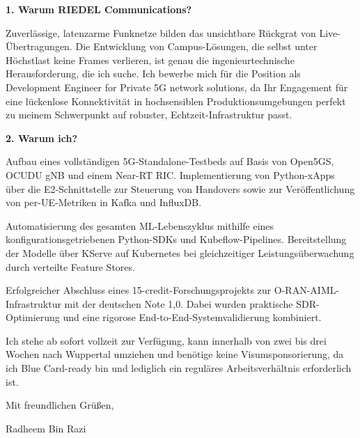 \documentclass[11pt,a4paper]{coverletter}
\begin{document}
\vspace{8pt}\noindent\textbf{1. Warum RIEDEL Communications?}\par\vspace{3pt}

Zuverlässige, latenzarme Funknetze bilden das unsichtbare Rückgrat von Live-Übertragungen. Die Entwicklung von Campus-Lösungen, die selbst unter Höchstlast keine Frames verlieren, ist genau die ingenieurtechnische Herausforderung, die ich suche. Ich bewerbe mich für die Position als Development Engineer for Private 5G network solutions, da Ihr Engagement für eine lückenlose Konnektivität in hochsensiblen Produktionsumgebungen perfekt zu meinem Schwerpunkt auf robuster, Echtzeit-Infrastruktur passt.

\vspace{8pt}\noindent\textbf{2. Warum ich?}\par\vspace{3pt}

\bullets

  \item Aufbau eines vollständigen 5G-Standalone-Testbeds auf Basis von Open5GS, OCUDU gNB und einem Near-RT RIC. Implementierung von Python-xApps über die E2-Schnittstelle zur Steuerung von Handovers sowie zur Veröffentlichung von per-UE-Metriken in Kafka und InfluxDB.

  \item Automatisierung des gesamten ML-Lebenszyklus mithilfe eines konfigurationsgetriebenen Python-SDKs und Kubeflow-Pipelines. Bereitstellung der Modelle über KServe auf Kubernetes bei gleichzeitiger Leistungsüberwachung durch verteilte Feature Stores.

  \item Erfolgreicher Abschluss eines 15-credit-Forschungsprojekts zur O-RAN-AIML-Infrastruktur mit der deutschen Note 1,0. Dabei wurden praktische SDR-Optimierung und eine rigorose End-to-End-Systemvalidierung kombiniert.

\bulletsend

Ich stehe ab sofort vollzeit zur Verfügung, kann innerhalb von zwei bis drei Wochen nach Wuppertal umziehen und benötige keine Visumsponsorierung, da ich Blue Card-ready bin und lediglich ein reguläres Arbeitsverhältnis erforderlich ist.

\closing{Mit freundlichen Grüßen,}{Radheem Bin Razi}
\end{document}
